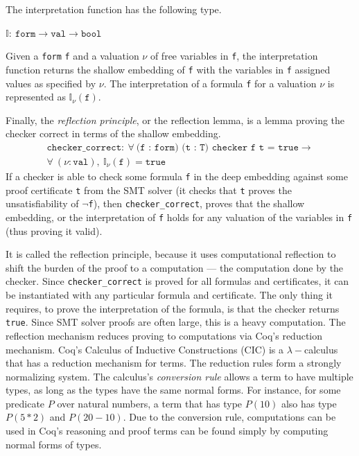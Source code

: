 \documentclass{article}
\begin{document}
	The interpretation function 
	has the following type.
	\begin{center}
		$\mathbb{I} :\ \texttt{form} \to 
		\texttt{val} \to \texttt{bool}$
	\end{center}
	Given a \texttt{form} \texttt{f} 
	and a valuation $\nu$ of free 
	variables in \texttt{f}, the 
	interpretation function returns 
	the shallow embedding of \texttt{f}
	with the variables in \texttt{f} 
	assigned values as specified by 
	$\nu$. The interpretation of a 
	formula \texttt{f} for a valuation 
	$\nu$ is represented as $\mathbb{I}_{\nu}
	(\texttt{f})$. 
	
	Finally, the 
	\textit{reflection principle}, 
	or the reflection lemma, is a 
	lemma proving the checker correct
	in terms of the shallow embedding.
	\begin{align*}
	\texttt{checker\_correct} :\ 
	\forall\ \texttt{(f : form)
		(t : T) checker f t = true} \to \\
	\forall\ (\nu : \texttt{val}),\ 
	\mathbb{I}_{\nu}(\texttt{f}) = 
	\texttt{true}
	\end{align*}
	If a checker is able to check 
	some formula \texttt{f} in 
	the deep embedding against
	some proof certificate \texttt{t} from 
	the SMT solver (it checks that 
	\texttt{t} proves the unsatisfiability
	of \texttt{$\neg$f}), then 
	\texttt{checker\_correct},
	proves that the shallow embedding,
	or the interpretation of \texttt{f}
	holds for any valuation of the 
	variables in \texttt{f} (thus 
	proving it valid). 
	
	It is called the reflection 
	principle, because it uses 
	computational reflection 
	to shift the burden of the 
	proof to a computation --- 
	the computation done by 
	the checker. Since 
	\texttt{checker\_correct}
	is proved for all formulas 
	and certificates, it can be 
	instantiated with any 
	particular formula and 
	certificate. The only thing it 
	requires, to 
	prove the interpretation of 
	the formula, is that the checker
	returns \texttt{true}.
	Since SMT solver proofs are 
	often large, this is a 
	heavy computation. The
	reflection mechanism reduces
	proving to computations via 
	Coq's reduction mechanism.
	Coq's Calculus of Inductive 
	Constructions (CIC) is a 
	$\lambda-$calculus that has a 
	reduction mechanism for terms. The
	reduction rules form a strongly 
	normalizing system. The calculus's
	\textit{conversion rule} allows a 
	term to have multiple types, as long as 
	the types have the same normal forms. 
	For instance, for some predicate $P$ 
	over natural numbers, a term that 
	has type $P(10)$ also has type 
	$P(5*2)$ and $P(20-10)$. Due 
	to the conversion rule, 
	computations can be used in Coq's 
	reasoning and proof terms can be 
	found simply by computing normal 
	forms of types.
	
\end{document}
